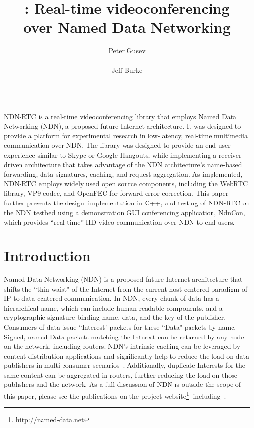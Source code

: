 \documentclass{icn/sig-alternate-2013} %
\title{\ndnrtcName{}: Real-time videoconferencing\\ over Named Data Networking}
\author{
\alignauthor Peter Gusev\\
       \affaddr{UCLA REMAP}\\
       \email{peter@remap.ucla.edu}
\alignauthor Jeff Burke\\
       \affaddr{UCLA REMAP}\\
       \email{jburke@remap.ucla.edu}
}
\newcommand{\ndnrtcName}{NDN-RTC} %
\newcommand{\ndnconName}{NdnCon}
\begin{document}
\maketitle

\abstract
\ndnrtcName{} is a real-time videoconferencing library that employs Named Data Networking (NDN), a proposed future Internet architecture. It was designed to 
provide a platform for experimental research in low-latency, real-time multimedia communication over NDN. The library was designed to provide an end-user experience similar to Skype or Google Hangouts, while implementing a receiver-driven architecture that takes advantage of the NDN architecture's name-based forwarding, data signatures, caching, and request aggregation.  As implemented, \ndnrtcName{} employs widely used open source components, including the WebRTC library, VP9 codec, and OpenFEC for forward error correction. This paper further presents the design, implementation in C++, and testing of \ndnrtcName{} on the NDN testbed using a demonstration GUI conferencing application, \ndnconName{}, which provides ``real-time'' HD video communication over NDN to end-users. 
\section{Introduction}
Named Data Networking (NDN) is a proposed future Internet architecture that shifts the ``thin waist" of the Internet from the current host-centered paradigm of IP to data-centered communication. In NDN, every chunk of data has a hierarchical name, which can include human-readable components, and a cryptographic signature binding name, data, and the key of the publisher.  Consumers of data issue ``Interest" packets for these ``Data" packets by name. Signed, named Data packets matching the Interest can be returned by any node on the network, including routers. NDN's intrinsic caching can be leveraged by content distribution applications and significantly help to reduce the load on data publishers in multi-consumer scenarios~\cite{ndnvideo}. Additionally, duplicate Interests for the same content can be aggregated in routers, further reducing the load on those publishers and the network. As a full discussion of NDN is outside the scope of this paper, please see the publications on the project website\footnote{\url{http://named-data.net}}, including~\cite{ndntechreport, ndntechreport0, ndn-netw}.
\end{document}
